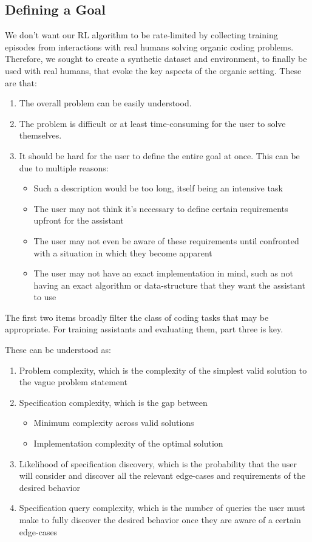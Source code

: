 \documentclass{article}
\begin{document}
\subsection{Defining a Goal}
We don't want our RL algorithm to be rate-limited by collecting training episodes from interactions with real humans solving organic coding problems. Therefore, we sought to create a synthetic dataset and environment, to finally be used with real humans, that evoke the key aspects of the organic setting. These are that:
\begin{enumerate}
    \item The overall problem can be easily understood.
    \item The problem is difficult or at least time-consuming for the user to solve themselves.
    \item It should be hard for the user to define the entire goal at once. This can be due to multiple reasons:
        \begin{itemize}
            \item Such a description would be too long, itself being an intensive task
            \item The user may not think it's necessary to define certain requirements upfront for the assistant
            \item The user may not even be aware of these requirements until confronted with a situation in which they become apparent
            \item The user may not have an exact implementation in mind, such as not having an exact algorithm or data-structure that they want the assistant to use
        \end{itemize}
\end{enumerate}

The first two items broadly filter the class of coding tasks that may be appropriate. For training assistants and evaluating them, part three is key.

These can be understood as:
\begin{enumerate}
    \item Problem complexity, which is the complexity of the simplest valid solution to the vague problem statement
    \item Specification complexity, which is the gap between
        \begin{itemize}
            \item Minimum complexity across valid solutions
            \item Implementation complexity of the optimal solution
        \end{itemize}
    \item Likelihood of specification discovery, which is the probability that the user will consider and discover all the relevant edge-cases and requirements of the desired behavior
    \item Specification query complexity, which is the number of queries the user must make to fully discover the desired behavior once they are aware of a certain edge-cases
\end{enumerate}
\end{document}
